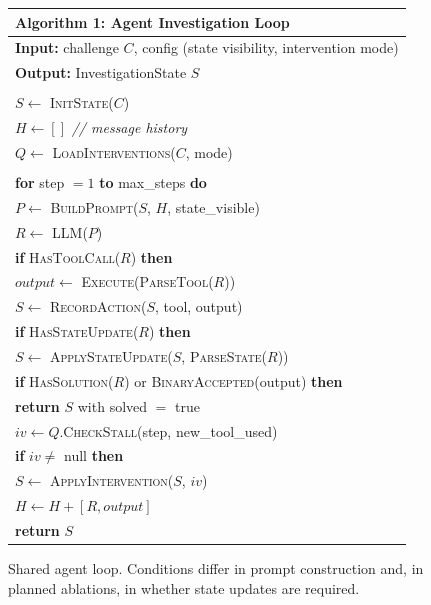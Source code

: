 \documentclass[letterpaper]{article}
\begin{document}
\begin{figure}[t]
\centering
\small
\begin{tabular}{l}
\toprule
\textbf{Algorithm 1:} Agent Investigation Loop \\
\midrule
\textbf{Input:} challenge $C$, config (state visibility, intervention mode) \\
\textbf{Output:} InvestigationState $S$ \\
\\
$S \leftarrow$ \textsc{InitState}($C$) \\
$H \leftarrow []$ \hfill \textit{// message history} \\
$Q \leftarrow$ \textsc{LoadInterventions}($C$, mode) \\
\\
\textbf{for} step $= 1$ \textbf{to} max\_steps \textbf{do} \\
\quad $P \leftarrow$ \textsc{BuildPrompt}($S$, $H$, state\_visible) \\
\quad $R \leftarrow$ \textsc{LLM}($P$) \\
\quad \textbf{if} \textsc{HasToolCall}($R$) \textbf{then} \\
\quad\quad $output \leftarrow$ \textsc{Execute}(\textsc{ParseTool}($R$)) \\
\quad\quad $S \leftarrow$ \textsc{RecordAction}($S$, tool, output) \\
\quad \textbf{if} \textsc{HasStateUpdate}($R$) \textbf{then} \\
\quad\quad $S \leftarrow$ \textsc{ApplyStateUpdate}($S$, \textsc{ParseState}($R$)) \\
\quad \textbf{if} \textsc{HasSolution}($R$) or \textsc{BinaryAccepted}(output) \textbf{then} \\
\quad\quad \textbf{return} $S$ with solved $=$ true \\
\quad $iv \leftarrow Q$.\textsc{CheckStall}(step, new\_tool\_used) \\
\quad \textbf{if} $iv \neq$ null \textbf{then} \\
\quad\quad $S \leftarrow$ \textsc{ApplyIntervention}($S$, $iv$) \\
\quad $H \leftarrow H + [R, output]$ \\
\textbf{return} $S$ \\
\bottomrule
\end{tabular}
\caption{Shared agent loop. Conditions differ in prompt construction and, in planned ablations, in whether state updates are required.}
\label{alg:loop}
\end{figure}
\end{document}
